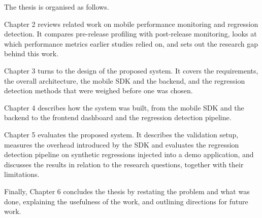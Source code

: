 The thesis is organised as follows.

Chapter 2 reviews related work on mobile performance monitoring and regression detection. It compares pre-release profiling with post-release monitoring, looks at which performance metrics earlier studies relied on, and sets out the research gap behind this work.

Chapter 3 turns to the design of the proposed system. It covers the requirements, the overall architecture, the mobile SDK and the backend, and the regression detection methods that were weighed before one was chosen.

Chapter 4 describes how the system was built, from the mobile SDK and the backend to the frontend dashboard and the regression detection pipeline.

Chapter 5 evaluates the proposed system. It describes the validation setup, measures the overhead introduced by the SDK and evaluates the regression detection pipeline on synthetic regressions injected into a demo application, and discusses the results in relation to the research questions, together with their limitations.

Finally, Chapter 6 concludes the thesis by restating the problem and what was done, explaining the usefulness of the work, and outlining directions for future work.
